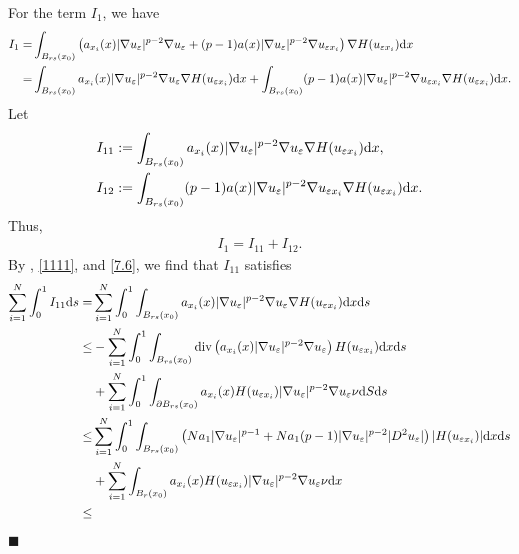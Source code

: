 \documentclass[onecolumn]{autart}
\newenvironment{proof}{{\it Proof: \enspace}}{\hfill $\blacksquare$\par}
\begin{document}
\begin{proof}
		For the term $I_1$, we have
		\begin{align}
			I_1
			=
			&\int_{B_{rs}(x_0)}\left(a_{x_i}(x) |\nabla u_\varepsilon|^{p-2} \nabla u_\varepsilon +(p-1) a(x)  |\nabla u_\varepsilon|^{p-2} \nabla u_{\varepsilon x_i}\right)\nabla H(u_{\varepsilon x_i}) \mathrm{d}x
			\notag\\ =
			& \int_{B_{rs}(x_0)}a_{x_i}(x) |\nabla u_\varepsilon|^{p-2} \nabla u_\varepsilon \nabla H(u_{\varepsilon x_i}) \mathrm{d}x + \int_{B_{rs}(x_0)} (p-1) a(x)  |\nabla u_\varepsilon|^{p-2} \nabla u_{\varepsilon x_i}\nabla H(u_{\varepsilon x_i}) \mathrm{d}x. \notag
		\end{align}
		Let
		\begin{align}
			&I_{11}:=\int_{B_{rs}(x_0)}a_{x_i}(x) |\nabla u_\varepsilon|^{p-2} \nabla u_\varepsilon \nabla H(u_{\varepsilon x_i}) \mathrm{d}x,\notag\\
			&I_{12}:=\int_{B_{rs}(x_0)} (p-1) a(x)  |\nabla u_\varepsilon|^{p-2} \nabla u_{\varepsilon x_i}\nabla H(u_{\varepsilon x_i}) \mathrm{d}x. \notag
		\end{align}
		Thus,
		\begin{align}\label{7.8}
			I_1 = I_{11} + I_{12}.
		\end{align}
		By  \cite[P.711]{Evans:2022}, \eqref{1111}, and \eqref{7.6}, we find that $I_{11}$ satisfies
		\begin{align}
			\sum_{i=1}^{N} \int_0^1 I_{11}\mathrm{d}s
			=
			&\sum_{i=1}^{N} \int_0^1 \int_{B_{rs}(x_0)}a_{x_i}(x) |\nabla u_\varepsilon|^{p-2} \nabla u_\varepsilon \nabla H(u_{\varepsilon x_i}) \mathrm{d}x\mathrm{d}s
			\notag\\ \leq
			&- \sum_{i=1}^{N} \int_0^1 \int_{B_{rs}(x_0)}\mathrm{div} \left( a_{x_i}(x) |\nabla u_\varepsilon|^{p-2} \nabla u_\varepsilon \right)  H(u_{\varepsilon x_i}) \mathrm{d}x\mathrm{d}s
			\notag\\
			&+  \sum_{i=1}^{N} \int_0^1 \int_{\partial B_{ rs}(x_0)} a_{x_i}(x)  H(u_{\varepsilon x_i})|\nabla u_\varepsilon|^{p-2} \nabla u_\varepsilon  \nu  \mathrm{d}S\mathrm{d}s
			\notag\\ \leq
			& \sum_{i=1}^{N} \int_0^1 \int_{B_{rs}(x_0)}\left( N a_1 |\nabla u_\varepsilon|^{p-1} + Na_1(p-1)|\nabla u_\varepsilon|^{p-2} |D^2 u_\varepsilon| \right)  |H(u_{\varepsilon x_i})| \mathrm{d}x\mathrm{d}s
			\notag\\
			&+  \sum_{i=1}^{N}  \int_{ B_{ r}(x_0)} a_{x_i}(x)  H(u_{\varepsilon x_i})|\nabla u_\varepsilon|^{p-2} \nabla u_\varepsilon  \nu  \mathrm{d}x
			\notag\\ \leq

\end{align}
\end{proof}
\end{document}

